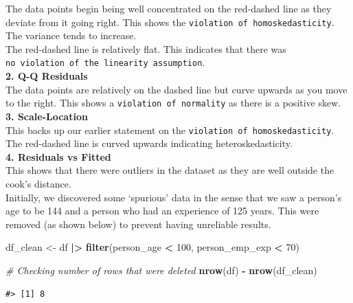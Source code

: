 \documentclass[
  10pt,
]{article}
\newenvironment{Shaded}{\begin{snugshade}}{\end{snugshade}}
\newcommand{\CommentTok}[1]{\textcolor[rgb]{0.56,0.35,0.01}{\textit{#1}}}
\newcommand{\DecValTok}[1]{\textcolor[rgb]{0.00,0.00,0.81}{#1}}
\newcommand{\FunctionTok}[1]{\textcolor[rgb]{0.13,0.29,0.53}{\textbf{#1}}}
\newcommand{\NormalTok}[1]{#1}
\newcommand{\OtherTok}[1]{\textcolor[rgb]{0.56,0.35,0.01}{#1}}
\newcommand{\SpecialCharTok}[1]{\textcolor[rgb]{0.81,0.36,0.00}{\textbf{#1}}}
\begin{document}
The data points begin being well concentrated on the red-dashed line as
they deviate from it going right. This shows the
\texttt{violation\ of\ homoskedasticity}. The variance tends to
increase.\\
The red-dashed line is relatively flat. This indicates that there was
\texttt{no\ violation\ of\ the\ linearity\ assumption}.\\

\textbf{2. Q-Q Residuals}\\

The data points are relatively on the dashed line but curve upwards as
you move to the right. This shows a \texttt{violation\ of\ normality} as
there is a positive skew.\\

\textbf{3. Scale-Location}\\

This backs up our earlier statement on the
\texttt{violation\ of\ homoskedasticity}. The red-dashed line is curved
upwards indicating heteroskedasticity.\\

\textbf{4. Residuals vs Fitted}\\

This shows that there were outliers in the dataset as they are well
outside the cook's distance.\\

Initially, we discovered some `spurious' data in the sense that we saw a
person's age to be 144 and a person who had an experience of 125 years.
This were removed (as shown below) to prevent having unreliable
results.\\

\begin{Shaded}
\begin{Highlighting}[]
\NormalTok{df\_clean }\OtherTok{\textless{}{-}}\NormalTok{ df }\SpecialCharTok{|\textgreater{}}
    \FunctionTok{filter}\NormalTok{(person\_age }\SpecialCharTok{\textless{}} \DecValTok{100}\NormalTok{, person\_emp\_exp }\SpecialCharTok{\textless{}} \DecValTok{70}\NormalTok{)}

\CommentTok{\# Checking number of rows that were deleted}
\FunctionTok{nrow}\NormalTok{(df) }\SpecialCharTok{{-}} \FunctionTok{nrow}\NormalTok{(df\_clean)}
\end{Highlighting}
\end{Shaded}

\begin{verbatim}
#> [1] 8
\end{verbatim}
\end{document}
